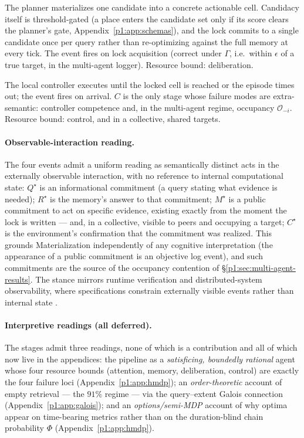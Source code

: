 \documentclass{article}
\begin{document}
\begin{description}[leftmargin=10pt,topsep=2pt,itemsep=2pt]
\item[$M^\star$ (target lock).] The planner materializes one candidate into a concrete actionable cell. Candidacy itself is threshold-gated (a place enters the candidate set only if its score clears the planner's gate, Appendix~\ref{p1:app:schemas}), and the lock commits to a single candidate once per query rather than re-optimizing against the full memory at every tick. The event fires on lock acquisition (correct under $\Gamma$, i.e.\ within $\epsilon$ of a true target, in the multi-agent logger). Resource bound: deliberation.
\item[$C^\star$ (closed-loop completion).] The local controller executes until the locked cell is reached or the episode times out; the event fires on arrival. $C$ is the only stage whose failure modes are extra-semantic: controller competence and, in the multi-agent regime, occupancy $\mathcal{O}_{-i}$. Resource bound: control, and in a collective, shared targets.
\end{description}

\paragraph{Observable-interaction reading.} The four events admit a
uniform reading as semantically distinct acts in the externally
observable interaction, with no reference to internal computational
state: $Q^\star$ is an informational commitment (a query stating what
evidence is needed); $R^\star$ is the memory's answer to that
commitment; $M^\star$ is a public commitment to act on specific
evidence, existing exactly from the moment the lock is written ---
and, in a collective, visible to peers and occupying a target;
$C^\star$ is the environment's confirmation that the commitment was
realized. This grounds Materialization independently of any cognitive
interpretation (the appearance of a public commitment is an objective
log event), and such commitments are the source of the
occupancy contention of \S\ref{p1:sec:multi-agent-results}. The stance
mirrors runtime verification and distributed-system observability,
where specifications constrain externally visible events rather than
internal state \citep{leucker2009runtime}.

\paragraph{Interpretive readings (all deferred).} The stages admit
three readings, none of which is a contribution and all of which now
live in the appendices: the pipeline as a \emph{satisficing, boundedly
rational} agent whose four resource bounds (attention, memory,
deliberation, control) are exactly the four failure loci
(Appendix~\ref{p1:app:hmdp}); an \emph{order-theoretic} account of empty
retrieval --- the $91\%$ regime --- via the query--extent Galois
connection (Appendix~\ref{p1:app:galois}); and an \emph{options/semi-MDP}
account of why optima appear on time-bearing metrics rather than on
the duration-blind chain probability $\Phi$
(Appendix~\ref{p1:app:hmdp}).
\end{document}
